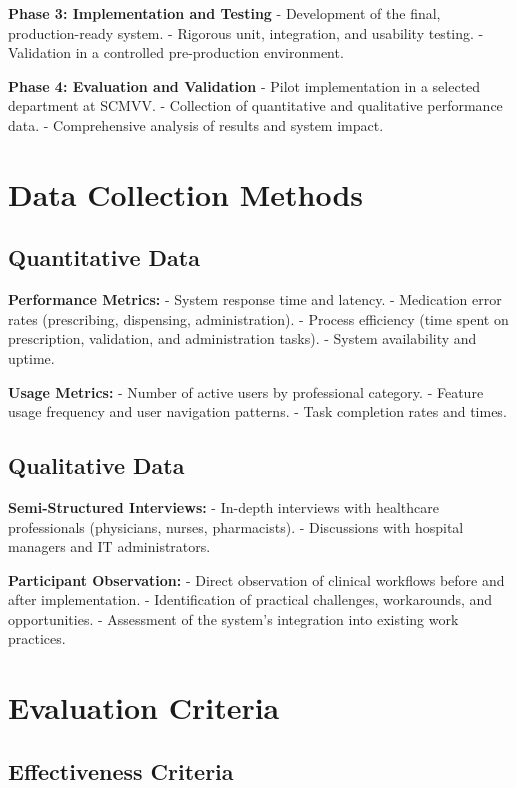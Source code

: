 \textbf{Phase 3: Implementation and Testing}
- Development of the final, production-ready system.
- Rigorous unit, integration, and usability testing.
- Validation in a controlled pre-production environment.

\textbf{Phase 4: Evaluation and Validation}
- Pilot implementation in a selected department at SCMVV.
- Collection of quantitative and qualitative performance data.
- Comprehensive analysis of results and system impact.

\section{Data Collection Methods}

\subsection{Quantitative Data}

\textbf{Performance Metrics:}
- System response time and latency.
- Medication error rates (prescribing, dispensing, administration).
- Process efficiency (time spent on prescription, validation, and administration tasks).
- System availability and uptime.

\textbf{Usage Metrics:}
- Number of active users by professional category.
- Feature usage frequency and user navigation patterns.
- Task completion rates and times.

\subsection{Qualitative Data}

\textbf{Semi-Structured Interviews:}
- In-depth interviews with healthcare professionals (physicians, nurses, pharmacists).
- Discussions with hospital managers and IT administrators.

\textbf{Participant Observation:}
- Direct observation of clinical workflows before and after implementation.
- Identification of practical challenges, workarounds, and opportunities.
- Assessment of the system's integration into existing work practices.

\section{Evaluation Criteria}

\subsection{Effectiveness Criteria}

